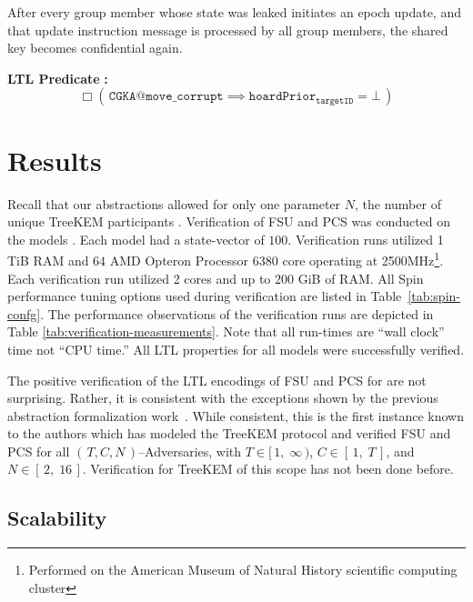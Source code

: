 \documentclass[runningheads]{llncs}
\newcommand{\Abrev}[1]{\gls{#1}}
\newcommand{\NumericRange}[2]{\ensuremath{\left[\,#1,\; #2\,\right]}\xspace}
\newcommand{\NumericRangeOpenR}[2]{\ensuremath{[\,#1,\; #2\,)}\xspace}
\begin{document}
\begin{definition}
After every group member whose state was leaked initiates an epoch update, and that update instruction message is processed by all group members, the shared key becomes confidential again.
\end{definition}%
\noindent\textbf{LTL Predicate} \textbf{:}%
\[%
\Box \left(\, \texttt{CGKA@move\_corrupt} \implies \texttt{hoardPrior}_{\texttt{targetID}} = \bot \,\right)%
\]%


\section{Results}

Recall that our abstractions allowed for only one parameter $N$, the number of unique TreeKEM participants .
Verification of  \Abrev{FSU} and \Abrev{PCS} was conducted on the models .
Each model had a state-vector of $100$\siBytes.
Verification runs utilized 1 TiB RAM and \(64\) AMD Opteron Processor 6380 core operating at 2500MHz\footnote{Performed on the American Museum of Natural History scientific computing cluster}.
Each verification run utilized 2 cores and up to 200 GiB of RAM.
All Spin performance tuning options used during verification are listed in Table~\ref{tab:spin-confg}.
The performance observations of the verification runs are depicted in Table \ref{tab:verification-measurements}.
Note that all run-times are ``wall clock'' time not ``CPU time.''
All \Abrev{LTL} properties for all models were successfully verified.

The positive verification of the LTL encodings of  \Abrev{FSU} and \Abrev{PCS} for  are not surprising.
Rather, it is consistent with the exceptions shown by the previous \CGKAdef abstraction formalization work~\cite{alwen2020security}.
While consistent, this is the first instance known to the authors which has modeled the TreeKEM protocol and verified \Abrev{FSU} and \Abrev{PCS} for all $(\,T, C, N\,)$--Adversaries, with $T \in \NumericRangeOpenR{1}{\infty}$, $C \in \NumericRange{1}{T}$, and $N \in \NumericRange{2}{16}$.
Verification for TreeKEM of this scope has not been done before.

\subsection{Scalability}
\end{document}
